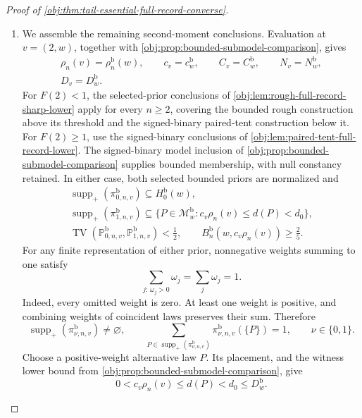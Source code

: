 \begin{proof}[Proof of \cref{obj:thm:tail-essential-full-record-converse}]
\begin{enumerate}
\item
We assemble the remaining second-moment conclusions. Evaluation at
\(v=(2,w)\), together with
\cref{obj:prop:bounded-submodel-comparison}, gives
\[
\begin{gathered}
\rho_n(v)=\rho_n^{\mathrm b}(w),\qquad
c_v=c_w^{\mathrm b},\qquad
C_v=C_w^{\mathrm b},\qquad
N_v=N_w^{\mathrm b},\\
D_v=D_w^{\mathrm b}.
\end{gathered}
\]
For \(F(2)<1\), the selected-prior conclusions of
\cref{obj:lem:rough-full-record-sharp-lower} apply for every \(n\ge2\),
covering the bounded rough construction above its threshold and the
signed-binary paired-tent construction below it. For \(F(2)\ge1\), use
the signed-binary conclusions of
\cref{obj:lem:paired-tent-full-record-lower}. The signed-binary model
inclusion of \cref{obj:prop:bounded-submodel-comparison} supplies bounded
membership, with null constancy retained. In either case, both selected
bounded priors are normalized and
\[
\begin{gathered}
\operatorname{supp}_+(\pi^{\mathrm b}_{0,n,v})
\subseteq H_0^{\mathrm b}(w),\\
\operatorname{supp}_+(\pi^{\mathrm b}_{1,n,v})
\subseteq
\{P\in\mathcal M_w^{\mathrm b}:
c_v\rho_n(v)\le d(P)<d_0\},\\
\operatorname{TV}(\mathbb P^{\mathrm b}_{0,n,v},
                  \mathbb P^{\mathrm b}_{1,n,v})<\frac12,\qquad
B_n^{\mathrm b}(w,c_v\rho_n(v))\ge\frac25.
\end{gathered}
\]
For any finite representation of either prior, nonnegative weights
summing to one satisfy
\[
\sum_{j:\,\omega_j>0}\omega_j=\sum_j\omega_j=1.
\]
Indeed, every omitted weight is zero. At least one weight is positive,
and combining weights of coincident laws preserves their sum.
Therefore
\[
\operatorname{supp}_+(\pi^{\mathrm b}_{\nu,n,v})\ne\varnothing,
\qquad
\sum_{P\in\operatorname{supp}_+(\pi^{\mathrm b}_{\nu,n,v})}
\pi^{\mathrm b}_{\nu,n,v}(\{P\})=1,
\qquad \nu\in\{0,1\}.
\]
Choose a positive-weight alternative law \(P\). Its placement, and the
witness lower bound from
\cref{obj:prop:bounded-submodel-comparison}, give
\[
0<c_v\rho_n(v)\le d(P)<d_0\le D_w^{\mathrm b}.
\]


\end{enumerate}
\end{proof}
